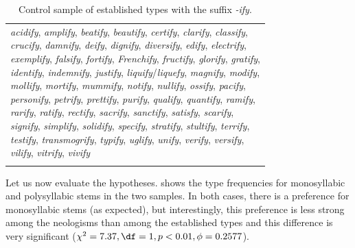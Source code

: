 \begin{table}
\caption{Control sample of established types with the suffix \textit{-ify}.}
\label{tab:ifycontrol}
\begin{tabular}[t]{l}
\lsptoprule
\makecell[tl]{
\textit{acidify}, \textit{amplify}, \textit{beatify}, \textit{beautify}, \textit{certify}, \textit{clarify}, \textit{classify}, \\ \textit{crucify}, \textit{damnify}, \textit{deify}, \textit{dignify}, \textit{diversify}, \textit{edify}, \textit{electrify}, \\ \textit{exemplify}, \textit{falsify}, \textit{fortify}, \textit{Frenchify}, \textit{fructify}, \textit{glorify}, \textit{gratify}, \\ \textit{identify}, \textit{indemnify}, \textit{justify}, \textit{liquify}\slash \textit{liquefy}, \textit{magnify}, \textit{modify}, \\ \textit{mollify}, \textit{mortify}, \textit{mummify}, \textit{notify}, \textit{nullify}, \textit{ossify}, \textit{pacify}, \\ \textit{personify}, \textit{petrify}, \textit{prettify}, \textit{purify}, \textit{qualify}, \textit{quantify}, \textit{ramify}, \\ \textit{rarify}, \textit{ratify}, \textit{rectify}, \textit{sacrify}, \textit{sanctify}, \textit{satisfy}, \textit{scarify}, \\ \textit{signify}, \textit{simplify}, \textit{solidify}, \textit{specify}, \textit{stratify}, \textit{stultify}, \textit{terrify}, \\ \textit{testify}, \textit{transmogrify}, \textit{typify}, \textit{uglify}, \textit{unify}, \textit{verify}, \textit{versify}, \\ \textit{vilify}, \textit{vitrify}, \textit{vivify}} \\
\lspbottomrule
\end{tabular}
\end{table}

Let us now evaluate the hypotheses.  shows the type  frequencies  for monosyllabic  and polysyllabic stems  in the two samples. In both cases, there is a preference for monosyllabic stems (as expected),  but interestingly, this preference is less strong among the neologisms  than among the established types and this difference is very significant ($\chi^2 = 7.37, \df = 1, p < 0.01, \phi = 0.2577$).

